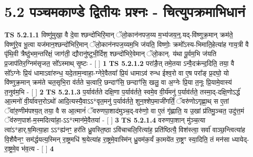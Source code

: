 \documentclass[17pt]{extarticle}
\begin{document}
     \section*{ 5.2      पञ्चमकाण्डे द्वितीयः प्रश्नः - चित्युपक्रमाभिधानं }
                                        \textbf{ TS 5.2.1.1} \newline
                  विष्णु॑मुखा॒ वै दे॒वा श्छन्दो॑भिरि॒मान् ॅलो॒कान॑नपज॒य्य म॒भ्य॑जय॒न्॒.यद्-वि॑ष्णुक्र॒मान् क्रम॑ते॒ विष्णु॑रे॒व भू॒त्वा यज॑मान॒श्छन्दो॑भिरि॒मान् ॅलो॒कान॑नपज॒य्यम॒भि ज॑यति॒ विष्णोः॒ क्रमो᳚ऽस्य-भिमाति॒हेत्या॑ह गाय॒त्री वै पृ॑थि॒वी त्रैष्ठु॑भम॒न्तरि॑क्षं॒ जाग॑ती॒ द्यौरानु॑ष्टुभी॒र्दिश॒ श्छन्दो॑भिरे॒वेमान् ॅलो॒कान्. य॑था पू॒र्वम॒भि ज॑यति प्र॒जाप॑तिर॒ग्निम॑सृजत॒ सो᳚ऽस्माथ् सृ॒ष्टः - [  ] \textbf{  1} \newline
                  \newline
                                \textbf{ TS 5.2.1.2} \newline
                  परा॑ङै॒त् तमे॒तया ऽन्वै॒दक्र॑न्द॒दिति॒ तया॒ वै सो᳚ऽग्नेः प्रि॒यं धामाऽवा॑रुन्ध॒ यदे॒ताम॒न्वाहा॒-ग्नेरे॒वैतया᳚ प्रि॒यं धामाऽव॑ रुन्ध ईश्व॒रो वा ए॒ष परा᳚ङ् प्र॒दघो॒ यो वि॑ष्णुक्र॒मान् क्रम॑ते चत॒सृभि॒रा व॑र्तते च॒त्वारि॒ छन्दाꣳ॑सि॒ छन्दाꣳ॑सि॒ खलु॒ वा अ॒ग्नेः प्रि॒या त॒नूः प्रि॒यामे॒वास्य॑ त॒नुव॑म॒भि - [  ] \textbf{  2} \newline
                  \newline
                                \textbf{ TS 5.2.1.3} \newline
                  प॒र्याव॑र्तते दक्षि॒णा प॒र्याव॑र्तते॒ स्वमे॒व वी॒र्य॑मनु॑ प॒र्याव॑र्तते॒ तस्मा॒द्-दक्षि॒णोऽर्द्ध॑ आ॒त्मनो॑ वी॒र्या॑वत्त॒रोऽथो॑ आदि॒त्यस्यै॒वाऽऽ*वृत॒मनु॑ प॒र्याव॑र्तते॒ शुन॒श्शेप॒माजी॑गर्तिं॒ ॅवरु॑णोऽगृह्णा॒थ् स ए॒तां ॅवा॑रु॒णीम॑पश्य॒त् तया॒ वै स आ॒त्मानं॑ ॅवरुणपा॒शाद॑मुञ्च॒द्-वरु॑णो॒ वा ए॒तं गृ॑ह्णाति॒ य उ॒खां प्र॑तिमु॒ञ्चत॒ उदु॑त्त॒मं ॅव॑रुण॒पाश॑-म॒स्मदित्या॑हा॒-ऽऽ*त्मान॑मे॒वैतया॑ - [  ] \textbf{  3} \newline
                  \newline
                                \textbf{ TS 5.2.1.4} \newline
                  वरुणपा॒शान् मु॑ञ्च॒त्या त्वा॑ऽ*हार्.ष॒मित्या॒हा ऽऽ*ह्य॑नꣳ॒॒ हर॑ति ध्रु॒वस्ति॒ष्ठा ऽवि॑चाचलि॒रित्या॑ह॒ प्रति॑ष्ठित्यै॒ विश॑स्त्वा॒ सर्वा॑ वाञ्छ॒न्त्वित्या॑ह वि॒शैवैनꣳ॒॒ सम॑र्द्धयत्य॒स्मिन् रा॒ष्ट्रमधि॑ श्र॒येत्या॑ह रा॒ष्ट्रमे॒वास्मि॑न् ध्रु॒वम॑क॒र्यं का॒मये॑त रा॒ष्ट्रꣳ स्या॒दिति॒ तं मन॑सा ध्यायेद्-रा॒ष्ट्रमे॒व भ॑व॒त्य - [  ] \textbf{  4} \newline
                  \newline
\end{document}
